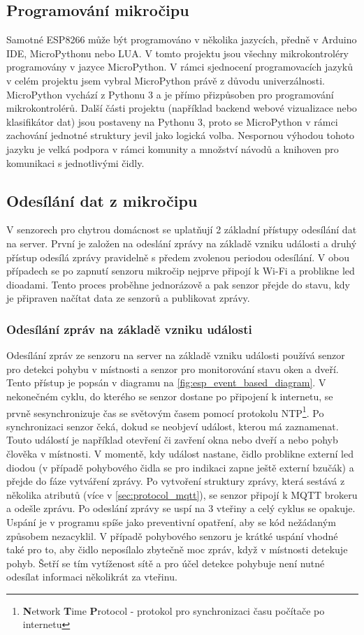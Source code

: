 \subsection*{Programování mikročipu}
Samotné ESP8266 může být programováno v několika jazycích, předně v Arduino IDE, MicroPythonu nebo LUA. V tomto projektu jsou všechny mikrokontroléry programovány v jazyce MicroPython. V rámci sjednocení programovacích jazyků v celém projektu jsem vybral MicroPython právě z důvodu univerzálnosti. MicroPython vychází z Pythonu 3 a je přímo přizpůsoben pro programování mikrokontrolérů. Další části projektu (například backend webové vizualizace nebo klasifikátor dat) jsou postaveny na Pythonu 3, proto se MicroPython v rámci zachování jednotné struktury jevil jako logická volba. Nespornou výhodou tohoto jazyku je velká podpora v rámci komunity a množství návodů a knihoven pro komunikaci s jednotlivými čidly. 

\subsection*{Odesílání dat z mikročipu}
V senzorech pro chytrou domácnost se uplatňují 2 základní přístupy odesílání dat na server. První je založen na odeslání zprávy na základě vzniku události a druhý přístup odesílá zprávy pravidelně s předem zvolenou periodou odesílání. V obou případech se po zapnutí senzoru mikročip nejprve připojí k Wi-Fi a problikne led dioadami. Tento proces proběhne jednorázově a pak senzor přejde do stavu, kdy je připraven načítat data ze senzorů a publikovat zprávy.

\subsubsection*{Odesílání zpráv na základě vzniku události} \label{subsec:event_based_msg}
Odesílání zpráv ze senzoru na server na základě vzniku události používá senzor pro detekci pohybu v místnosti a senzor pro monitorování stavu oken a dveří. Tento přístup je popsán v diagramu na \cref{fig:esp_event_based_diagram}. V nekonečném cyklu, do kterého se senzor dostane po připojení k internetu, se prvně sesynchronizuje čas se světovým časem pomocí protokolu NTP\footnote{\textbf{N}etwork \textbf{T}ime \textbf{P}rotocol - protokol pro synchronizaci času počítače po internetu}. Po synchronizaci senzor čeká, dokud se neobjeví událost, kterou má zaznamenat. Touto událostí je například otevření či zavření okna nebo dveří a nebo pohyb člověka v místnosti. V momentě, kdy událost nastane, čidlo problikne externí led diodou (v případě pohybového čidla se pro indikaci zapne ještě externí bzučák) a přejde do fáze vytváření zprávy. Po vytvoření struktury zprávy, která sestává z několika atributů (více v \cref{sec:protocol_mqtt}), se senzor připojí k MQTT brokeru a odešle zprávu. Po odeslání zprávy se uspí na 3 vteřiny a celý cyklus se opakuje. Uspání je v programu spíše jako preventivní opatření, aby se kód nežádaným způsobem nezacyklil. V případě pohybového senzoru je krátké uspání vhodné také pro to, aby čidlo neposílalo zbytečně moc zpráv, když v místnosti detekuje pohyb. Šetří se tím vytíženost sítě a pro účel detekce pohybuje není nutné odesílat informaci několikrát za vteřinu.


